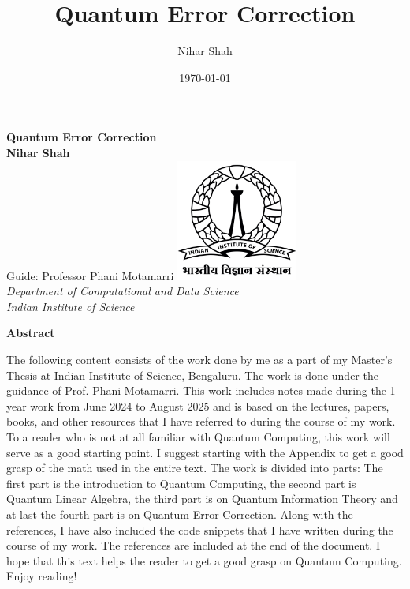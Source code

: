 \documentclass[12pt, oneside]{book}
\theoremstyle{definition}
\theoremstyle{definition}
\theoremstyle{remark}
\newcommand{\abstractname}{Abstract}
\newenvironment{abstract}{%
\clearpage
\null\vfill
\begin{center}%
    \bfseries \abstractname
\end{center}}%
{\vfill\null}
\begin{document}
\frontmatter

\title{\vspace{-3.0cm}Quantum Error Correction}  %
\author{Nihar Shah}  %
\date{\today}  %
\maketitle  %

\begin{center}
\vspace*{2cm}
\textbf{Quantum Error Correction}\\[1cm]
\textbf{Nihar Shah}\\[1cm]
Guide: Professor Phani Motamarri
\vfill
\includegraphics[width=0.3\textwidth]{images/IISc_Master_Seal_Black.jpg}\\[1cm]
\large \textit{Department of Computational and Data Science}\\
\large \textit{Indian Institute of Science}
\vfill
\end{center}

\frontmatter

\begin{abstract}
The following content consists of the work done by me as a part of my Master's Thesis at Indian
Institute of Science, Bengaluru. The work is done under the guidance of Prof. Phani Motamarri. 
This work includes notes made during the 1 year work from June 2024 to August 2025 and is based on the
lectures, papers, books, and other resources that I have referred to during the course of my work.
To a reader who is not at all familiar with Quantum Computing, this work will serve as a good starting point. 
I suggest starting with the Appendix to get a good grasp of the math used in the entire text. 
The work is divided into parts: The first part is the introduction to Quantum Computing, the second part is Quantum Linear Algebra, the third part is on Quantum Information Theory and at last the fourth part is on Quantum Error Correction. Along with the references, 
I have also included the code snippets that I have written during the course of my work. The references are included at the end of the document.
I hope that this text helps the reader to get a good grasp on Quantum Computing. Enjoy reading!
\end{abstract}
\end{document}
